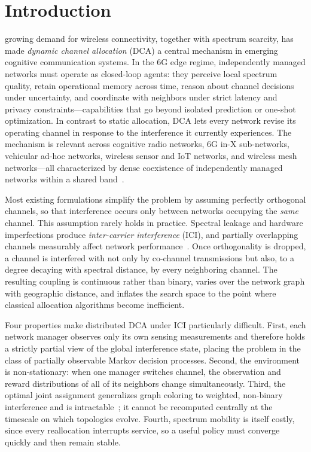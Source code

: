 \documentclass[journal]{IEEEtran}
\begin{document}
\section{Introduction}
\label{sec:intro}

 growing demand for wireless connectivity, together with
spectrum scarcity, has made \emph{dynamic channel allocation} (DCA) a central
mechanism in emerging cognitive communication systems. In the 6G edge regime,
independently managed networks must operate as closed-loop agents: they
perceive local spectrum quality, retain operational memory across time, reason
about channel decisions under uncertainty, and coordinate with neighbors under
strict latency and privacy constraints---capabilities that go beyond isolated
prediction or one-shot optimization. In contrast to static allocation, DCA lets
every network revise its operating channel in response to the interference it
currently experiences. The mechanism is relevant across cognitive radio
networks, 6G in-X sub-networks, vehicular ad-hoc networks, wireless sensor and
IoT networks, and wireless mesh networks---all characterized by dense
coexistence of independently managed networks within a shared
band~\cite{cohen2024carlton}.

Most existing formulations simplify the problem by assuming perfectly
orthogonal channels, so that interference occurs only between networks
occupying the \emph{same} channel. This assumption rarely holds in practice.
Spectral leakage and hardware imperfections produce \emph{inter-carrier
interference} (ICI), and partially overlapping channels measurably affect
network performance~\cite{mishra2006overlapped}. Once orthogonality is dropped,
a channel is interfered with not only by co-channel transmissions but also, to
a degree decaying with spectral distance, by every neighboring channel. The
resulting coupling is continuous rather than binary, varies over the network
graph with geographic distance, and inflates the search space to the point
where classical allocation algorithms become inefficient.

Four properties make distributed DCA under ICI particularly difficult. First,
each network manager observes only its own sensing measurements and therefore
holds a strictly partial view of the global interference state, placing the
problem in the class of partially observable Markov decision processes.
Second, the environment is non-stationary: when one manager switches channel,
the observation and reward distributions of all of its neighbors change
simultaneously. Third, the optimal joint assignment generalizes graph coloring
to weighted, non-binary interference and is
intractable~\cite{blum2003metaheuristics}; it cannot be recomputed centrally at
the timescale on which topologies evolve. Fourth, spectrum mobility is itself
costly, since every reallocation interrupts service, so a useful policy must
converge quickly and then remain stable.
\end{document}
